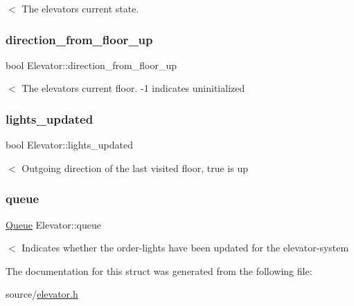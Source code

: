 $<$ The elevators current state. \mbox{\label{structElevator_aa27b6845cc930c06eefd0e7b6842d747}} 
\subsubsection{\texorpdfstring{direction\+\_\+from\+\_\+floor\+\_\+up}{direction\_from\_floor\_up}}
{\footnotesize\ttfamily bool Elevator\+::direction\+\_\+from\+\_\+floor\+\_\+up}

$<$ The elevators current floor. -\/1 indicates uninitialized \mbox{\label{structElevator_a414af4bd61cd50f830e3c0e822b45c6b}} 
\subsubsection{\texorpdfstring{lights\+\_\+updated}{lights\_updated}}
{\footnotesize\ttfamily bool Elevator\+::lights\+\_\+updated}

$<$ Outgoing direction of the last visited floor, true is up \mbox{\label{structElevator_af5239ff4e1b725701da4934f8c9443b2}} 
\subsubsection{\texorpdfstring{queue}{queue}}
{\footnotesize\ttfamily \hyperlink{structQueue}{Queue} Elevator\+::queue}

$<$ Indicates whether the order-\/lights have been updated for the elevator-\/system 

The documentation for this struct was generated from the following file\+:\begin{DoxyCompactItemize}
\item 
source/\hyperlink{elevator_8h}{elevator.\+h}\end{DoxyCompactItemize}
